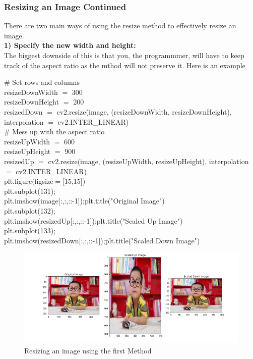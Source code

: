 \documentclass[fleqn]{article}
\begin{document}
    \newpage

    \subsubsection{Resizing an Image Continued}
    There are two main ways of using the resize method to effectively resize an image.\\
    \textbf{1) Specify the new width and height:}\\
    The biggest downside of this is that you, the programmmer, will have to keep track of the aspect ratio as the mthod will not preserve it. Here is an example

    \begin{center}
      \# Set rows and columns\\
      resizeDownWidth $=$ 300\\
      resizeDownHeight $=$ 200\\
      resizedDown $=$ cv2.resize(image, (resizeDownWidth, resizeDownHeight), interpolation $=$ cv2.INTER\_LINEAR)\\

      \# Mess up with the aspect ratio\\
      resizeUpWidth $=$ 600\\
      resizeUpHeight $=$ 900\\
      resizedUp $=$ cv2.resize(image, (resizeUpWidth, resizeUpHeight), interpolation $=$ cv2.INTER\_LINEAR)\\

      plt.figure(figsize$=$[15,15])\\
      plt.subplot(131);\\
      plt.imshow(image[:,:,::-1]);plt.title("Original Image")\\
      plt.subplot(132);\\
      plt.imshow(resizedUp[:,:,::-1]);plt.title("Scaled Up Image")\\
      plt.subplot(133);\\
      plt.imshow(resizedDown[:,:,::-1]);plt.title("Scaled Down Image")\\
    \end{center}

    \begin{figure}[h]
      \centering
      \includegraphics[width=500pt]{resizing1.png}
      \caption{Resizing an image using the first Method}
      \label{resizing1}
    \end{figure}
\end{document}

